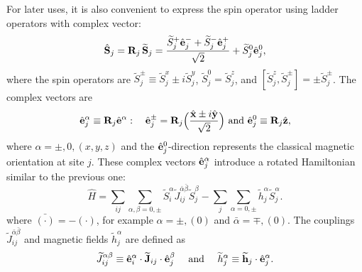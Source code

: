 \documentclass[aps, prx, nofootinbib, superscriptaddress]{revtex4-2}
\begin{document}
For later uses, it is also convenient to express the spin operator using ladder operators with complex vector:
\begin{equation}\label{eq: Spin rotation-ladder}
    \hat{\bf S}_j = \mathbf{R}_j \, \widetilde{\mathbf{S}}_j
    = \frac{\widetilde{S}_{j}^{+} \hat{\bf e}^{-}_{j} + \widetilde{S}_{j}^{-} \hat{\bf e}^{+}_{j} }{\sqrt{2}} + \widetilde{S}^{0}_{j} \hat{\bf e}^{0}_{j},
\end{equation}
where the spin operators are $\widetilde{S}_{j}^{\pm} \equiv \widetilde{S}_{j}^{x} \pm i \widetilde{S}_{j}^{y}$, $\widetilde{S}^{0}_{j} = \widetilde{S}^{z}_{j}$, and $[\widetilde{S}^{z}_{j}, \widetilde{S}^{\pm}_{j}] = \pm \widetilde{S}^{\pm}_{j}$.
The complex vectors are
\begin{equation}
    \hat{\bf e}_{j}^{\alpha} \equiv \mathbf{R}_{j} \hat{\bf e}^{\alpha}: \quad 
    \hat{\bf e}^{\pm}_{j} = \mathbf{R}_{j} \Big( \frac{ \hat{\bf x} \pm i \hat{\bf y} }{\sqrt{2}} \Big)
    \text{ and }
    \hat{\bf e}_{j}^{0} \equiv \mathbf{R}_{j} \hat{\bf z},
\end{equation}
where $\alpha = \pm, 0, (x,y,z)$ and the $\hat{\bf e}_{j}^{0}$-direction represents the classical magnetic orientation at site $j$. 
These complex vectors $\hat{\bf e}_{j}^{\alpha}$ introduce a rotated Hamiltonian similar to the previous one:
\begin{equation}
    \hat{H} 
    = \sum_{ij} \sum_{\alpha, \beta = 0, \pm} 
    \widetilde{S}^{\alpha}_{i} \widetilde{J}^{\bar{\alpha}\bar{\beta}}_{ij} \widetilde{S}^{\beta}_{j} 
    - \sum_{j} \sum_{\alpha = 0, \pm} \widetilde{h}^{\alpha}_{j} \widetilde{S}^{\alpha}_{j}.
\end{equation}
where $\bar{(\cdot)} = - ( \cdot )$, for example $\alpha = \pm, (0)$ and $\bar{\alpha} = \mp, (0)$.
The couplings $\widetilde{J}^{\bar{\alpha}\bar{\beta}}_{ij}$ and magnetic fields $\widetilde{h}_{j}^{\alpha}$ are defined as 
\begin{equation}
    \widetilde{J}^{\alpha\beta}_{ij} \equiv \hat{\bf e}_{i}^{\alpha} \cdot \widetilde{\bf J}_{ij} \cdot \hat{\bf e}_{j}^{\beta}
    \quad \text{ and } \quad
    \widetilde{h}^{\alpha}_{j} \equiv \widetilde{\bf h}_{j} \cdot \hat{\bf e}^{\alpha}_{j}.
\end{equation}
\end{document}

